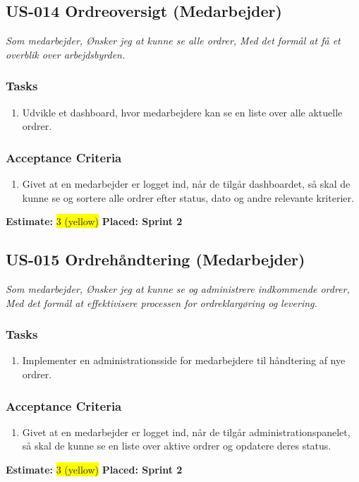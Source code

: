 \subsection{US-014 Ordreoversigt (Medarbejder)}
\label{sec:US-014}
\textit{Som medarbejder, Ønsker jeg at kunne se alle ordrer, Med det formål at få et overblik over arbejdsbyrden.}
\subsubsection*{\textbf{Tasks}}
\begin{enumerate}
  \item Udvikle et dashboard, hvor medarbejdere kan se en liste over alle aktuelle ordrer.
\end{enumerate}
\subsubsection*{\textbf{Acceptance Criteria}}
\begin{enumerate}
  \item Givet at en medarbejder er logget ind, når de tilgår dashboardet, så skal de kunne se og sortere alle ordrer efter status, dato og andre relevante kriterier.
\end{enumerate}
\textbf{Estimate:} \colorbox{yellow}{3 (yellow)}
\textbf{Placed: Sprint 2}
\par\noindent\dotfill

\subsection{US-015 Ordrehåndtering (Medarbejder)}
\label{sec:US-015}
\textit{Som medarbejder, Ønsker jeg at kunne se og administrere indkommende ordrer, Med det formål at effektivisere processen for ordreklargøring og levering.}
\subsubsection*{\textbf{Tasks}}
\begin{enumerate}
  \item Implementer en administrationsside for medarbejdere til håndtering af nye ordrer.
\end{enumerate}
\subsubsection*{\textbf{Acceptance Criteria}}
\begin{enumerate}
  \item Givet at en medarbejder er logget ind, når de tilgår administrationspanelet, så skal de kunne se en liste over aktive ordrer og opdatere deres status.
\end{enumerate}
\textbf{Estimate:} \colorbox{yellow}{3 (yellow)}
\textbf{Placed: Sprint 2}
\par\noindent\dotfill

